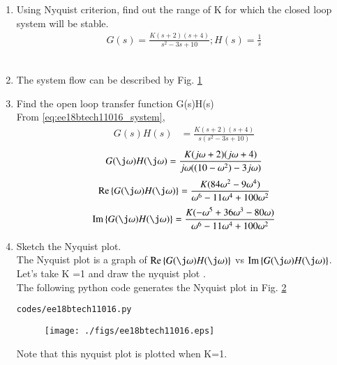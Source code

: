 \begin{enumerate}[label=\thesection.\arabic*.,ref=\thesection.\theenumi]
\item Using Nyquist criterion, find out the range of K for which the closed loop system will be stable.
\begin{align}
\label{eq:ee18btech11016_system}
 G(s)=\frac{K(s+2)(s+4)}{s^2-3s+10} ;  H(s) = \frac{1}{s}  
\end{align}
\\
\item The system flow can be described by Fig. \ref{fig:ee18btech11016_figure1}
\begin{figure}[!ht]
    \begin{center}
        \resizebox{\columnwidth}{!}{}
    \end{center}
    \caption{}  
    \label{fig:ee18btech11016_figure1}
\end{figure}
\item Find the open loop transfer function G(s)H(s)
\\
\solution From \eqref{eq:ee18btech11016_system},
%
 \begin{align}
 \label{eq:ee18btech11016_system_equation}
G(s)H(s)&=\frac{K(s+2)(s+4)}{s(s^2-3s+10)}
 \end{align}
 \begin{align}
G(\j \omega)H(\j \omega)=\frac{K(j\omega+2)(j\omega+4)}{j\omega((10-\omega^2)-3j\omega)}
\end{align}
\begin{align}
 \text{Re} \cbrak{G(\j \omega)H(\j \omega)}=\frac{K(84\omega^2 - 9\omega^4)}{\omega^6-11\omega^4+100\omega^2} 
\end{align}
\begin{align}
 \text{Im} \cbrak{G(\j \omega)H(\j \omega)}=\frac{K(-\omega^5 + 36\omega^3-80\omega)}{\omega^6-11\omega^4+100\omega^2} 
\end{align}
%
\item Sketch the Nyquist plot.
\\
\solution The Nyquist plot is a graph of $\text{Re} \cbrak{G(\j \omega)H(\j \omega)}$  vs $\text{Im} \cbrak{G(\j \omega)H(\j \omega)}$.
Let's take K =1 and draw the nyquist plot . 
\\

The following python code generates the Nyquist plot in Fig.  \ref{fig:ee18btech11016}
\begin{lstlisting}
codes/ee18btech11016.py
\end{lstlisting}
%
\begin{figure}[!h]
  \centering
  \texttt{[image: ./figs/ee18btech11016.eps]}
  \caption{}
  \label{fig:ee18btech11016}
\end{figure}
%
Note that this nyquist plot is plotted when K=1.
\\
 

\end{enumerate}
